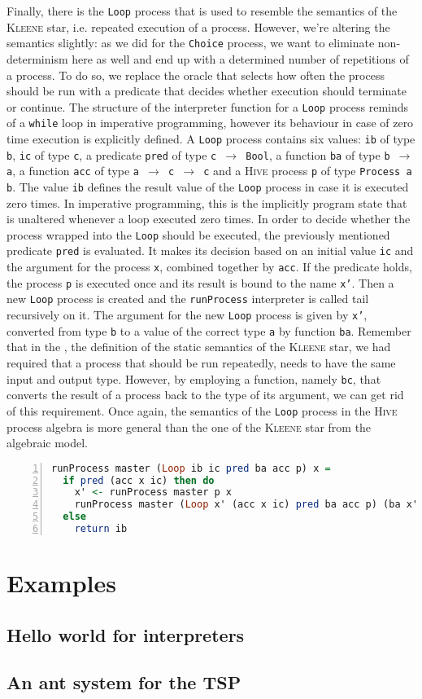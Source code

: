 Finally, there is the \texttt{Loop} process that is used to resemble the semantics of the \textsc{Kleene} star, i.e. repeated execution of a process. However, we're altering the semantics slightly: as we did for the \texttt{Choice} process, we want to eliminate non-determinism here as well and end up with a determined number of repetitions of a process. To do so, we replace the oracle that selects how often the process should be run with a predicate that decides whether execution should terminate or continue. The structure of the interpreter function for a \texttt{Loop} process reminds of a \texttt{while} loop in imperative programming, however its behaviour in case of zero time execution is explicitly defined. A \texttt{Loop} process contains six values: \texttt{ib} of type \texttt{b}, \texttt{ic} of type \texttt{c}, a predicate \texttt{pred} of type \texttt{c $\to$ Bool}, a function \texttt{ba} of type \texttt{b $\to$ a}, a function \texttt{acc} of type \texttt{a $\to$ c $\to$ c} and a \textsc{Hive} process \texttt{p} of type \texttt{Process a b}. The value \texttt{ib} defines the result value of the \texttt{Loop} process in case it is executed zero times. In imperative programming, this is the implicitly program state that is unaltered whenever a loop executed zero times. In order to decide whether the process wrapped into the \texttt{Loop} should be executed, the previously mentioned predicate \texttt{pred} is evaluated. It makes its decision based on an initial value \texttt{ic} and the argument for the process \texttt{x}, combined together by \texttt{acc}. If the predicate holds, the process \texttt{p} is executed once and its result is bound to the name \texttt{x'}. Then a new \texttt{Loop} process is created and the \texttt{runProcess} interpreter is called tail recursively on it. The argument for the new \texttt{Loop} process is given by \texttt{x'}, converted from type \texttt{b} to a value of the correct type \texttt{a} by function \texttt{ba}. Remember that in the , the definition of the static semantics of the \textsc{Kleene} star, we had required that a process that should be run repeatedly, needs to have the same input and output type. However, by employing a function, namely \texttt{bc}, that converts the result of a process back to the type of its argument, we can get rid of this requirement. Once again, the semantics of the \texttt{Loop} process in the \textsc{Hive} process algebra is more general than the one of the \textsc{Kleene} star from the algebraic model.
\begin{lstlisting}[language=Haskell,caption=Implementation of the interpreter for \texttt{Loop} processes.,numbers=left,frame=bt]
runProcess master (Loop ib ic pred ba acc p) x =
  if pred (acc x ic) then do
    x' <- runProcess master p x
    runProcess master (Loop x' (acc x ic) pred ba acc p) (ba x')
  else
    return ib
\end{lstlisting}

\section{Examples}
\label{chp:example}

\subsection{Hello world for interpreters}

\subsection{An ant system for the TSP}